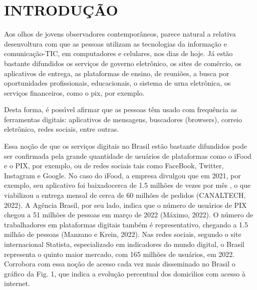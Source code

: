 \documentclass[
12pt,		%
openright,	%
twoside,  %
a4paper,			%
chapter=TITLE,		%
english,			%
french,				%
spanish,			%
brazil				%
]{USPSC-classe/USPSC}
\begin{document}
\chapter[INTRODU\c{C}\~AO]{INTRODU\c{C}\~AO}\label{INTRODU\c{C}\~AO}
Aos olhos de jovens observadores contempor\^aneos, parece natural a relativa desenvoltura com que as pessoas utilizam  as tecnologias da informa\c{c}\~ao e comunica\c{c}\~ao-TIC, em computadores e celulares, nos dias de hoje. J\'a est\~ao bastante difundidos os servi\c{c}os de governo eletr\^onico, os sites de com\'ercio, os  aplicativos de entrega, as plataformas de ensino, de reuni\~oes, a busca por oportunidades profissionais, educacionais, o sistema de urna eletr\^onica, os servi\c{c}os financeiros, como o pix, por exemplo.








Desta forma, \'e poss\'{\i}vel afirmar que as pessoas t\^em usado com frequ\^encia  as ferramentas digitais: aplicativos de mensagens, buscadores (browsers), correio eletr\^onico, redes sociais, entre outras.








Essa no\c{c}\~ao de que os servi\c{c}os digitais no Brasil est\~ao bastante difundidos pode ser confirmada pela grande quantidade de usu\'arios de plataformas como o iFood e o PIX, por exemplo, ou de redes sociais tais como FaceBook, Twitter, Instagram e Google. No caso do iFood, a empresa divulgou que em 2021, por exemplo, seu aplicativo foi \textquotedbl baixado\textquotedbl  cerca de 1.5 milh\~oes de vezes por m\^es , o que viabilizou a entrega mensal de cerca de 60 milh\~oes de pedidos  (CANALTECH, 2022). A Ag\^encia Brasil, por seu lado, indica que o n\'umero de usu\'arios de PIX chegou a 51 milh\~oes de pessoas em mar\c{c}o de 2022  (M\'aximo, 2022). O n\'umero de trabalhadores em plataformas digitais tamb\'em \'e representativo, chegando a 1.5 milh\~ao de pessoas  (Manzano e Krein, 2022). Nas redes sociais, segundo o site internacional Statista, especializado em indicadores do mundo digital, o Brasil representa o quinto maior mercado, com 165 milh\~oes de usu\'arios, em 2022. Corrobora com essa no\c{c}\~ao de acesso cada vez mais disseminado no Brasil o gr\'afico da Fig. 1, que indica a evolu\c{c}\~ao percentual dos domic\'{\i}lios com acesso \`a internet.
\end{document}
